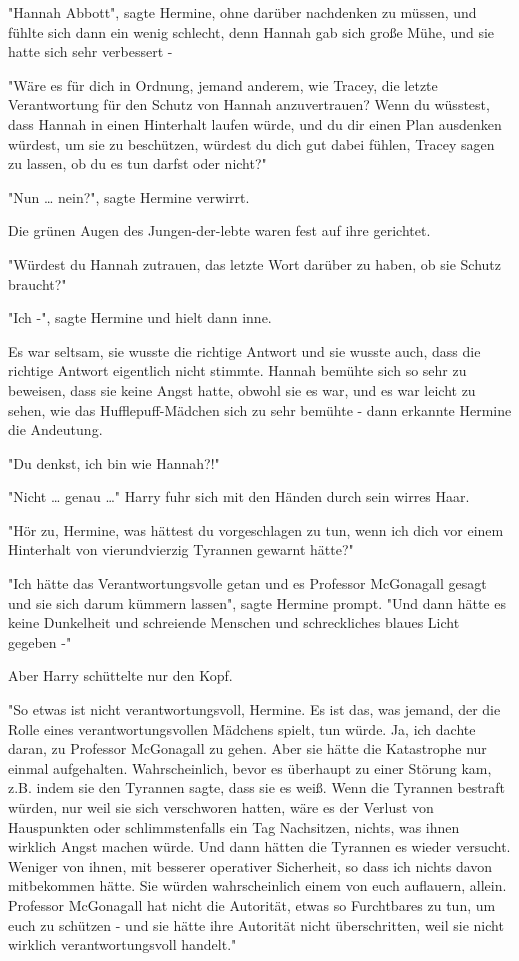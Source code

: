 {"Hannah Abbott", sagte Hermine, ohne darüber nachdenken zu müssen, und fühlte sich dann ein wenig schlecht, denn Hannah gab sich große Mühe, und sie hatte sich sehr verbessert -

"Wäre es für dich in Ordnung, jemand anderem, wie Tracey, die letzte Verantwortung für den Schutz von Hannah anzuvertrauen? Wenn du wüsstest, dass Hannah in einen Hinterhalt laufen würde, und du dir einen Plan ausdenken würdest, um sie zu beschützen, würdest du dich gut dabei fühlen, Tracey sagen zu lassen, ob du es tun darfst oder nicht?"

"Nun … nein?", sagte Hermine verwirrt.

Die grünen Augen des Jungen-der-lebte waren fest auf ihre gerichtet.

"Würdest du Hannah zutrauen, das letzte Wort darüber zu haben, ob sie Schutz braucht?"

"Ich -", sagte Hermine und hielt dann inne.

Es war seltsam, sie wusste die richtige Antwort und sie wusste auch, dass die richtige Antwort eigentlich nicht stimmte. Hannah bemühte sich so sehr zu beweisen, dass sie keine Angst hatte, obwohl sie es war, und es war leicht zu sehen, wie das Hufflepuff-Mädchen sich zu sehr bemühte - dann erkannte Hermine die Andeutung.

"Du denkst, ich bin wie Hannah?!"

"Nicht … genau …" Harry fuhr sich mit den Händen durch sein wirres Haar.

"Hör zu, Hermine, was hättest du vorgeschlagen zu tun, wenn ich dich vor einem Hinterhalt von vierundvierzig Tyrannen gewarnt hätte?"

"Ich hätte das Verantwortungsvolle getan und es Professor McGonagall gesagt und sie sich darum kümmern lassen", sagte Hermine prompt. "Und dann hätte es keine Dunkelheit und schreiende Menschen und schreckliches blaues Licht gegeben -"

Aber Harry schüttelte nur den Kopf.

"So etwas ist nicht verantwortungsvoll, Hermine. Es ist das, was jemand, der die Rolle eines verantwortungsvollen Mädchens spielt, tun würde. Ja, ich dachte daran, zu Professor McGonagall zu gehen. Aber sie hätte die Katastrophe nur einmal aufgehalten. Wahrscheinlich, bevor es überhaupt zu einer Störung kam, z.B. indem sie den Tyrannen sagte, dass sie es weiß. Wenn die Tyrannen bestraft würden, nur weil sie sich verschworen hatten, wäre es der Verlust von Hauspunkten oder schlimmstenfalls ein Tag Nachsitzen, nichts, was ihnen wirklich Angst machen würde. Und dann hätten die Tyrannen es wieder versucht. Weniger von ihnen, mit besserer operativer Sicherheit, so dass ich nichts davon mitbekommen hätte. Sie würden wahrscheinlich einem von euch auflauern, allein. Professor McGonagall hat nicht die Autorität, etwas so Furchtbares zu tun, um euch zu schützen - und sie hätte ihre Autorität nicht überschritten, weil sie nicht wirklich verantwortungsvoll handelt."

}
